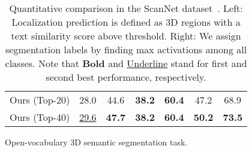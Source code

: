 \begin{table*}[!t]
\begin{subtable}[t]{.495\linewidth}
{\begin{tabular}{l|cccccc}
                Ours (Top-20) &  28.0 & 44.6 & \textbf{38.2} &  \textbf{60.4} & 47.2 & 68.9 \\
                Ours (Top-40) &  \underline{29.6} & \textbf{47.7} & \textbf{38.2} &  \textbf{60.4} & \textbf{50.2} & \textbf{73.5} \\
                \bottomrule
            \end{tabular}
        }
    \caption{
        Open-vocabulary 3D semantic segmentation task.
    } 
    \label{table:3d_seg}
    \end{subtable}
    \caption{
        Quantitative comparison in the ScanNet dataset~\cite{dai2017scannet}.
        Left: Localization prediction is defined as 3D regions with a text similarity score above threshold. 
        Right: We assign segmentation labels by finding max activations among all classes. 
        Note that \textbf{Bold} and \underline{Underline} stand for first and second best performance, respectively.
    }
    \label{table:3d_loc_and_seg}
\end{table*}


